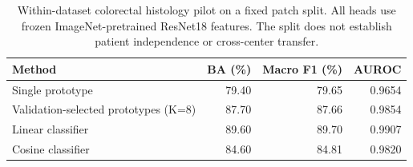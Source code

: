 \begin{table}[t]
\centering
\small
\caption{Within-dataset colorectal histology pilot on a fixed patch split. All heads use frozen ImageNet-pretrained ResNet18 features. The split does not establish patient independence or cross-center transfer.}
\label{tab:histology-pilot}
\begin{tabular}{lrrr}
\hline
Method & BA (\%) & Macro F1 (\%) & AUROC \\
\hline
Single prototype & 79.40 & 79.65 & 0.9654 \\
Validation-selected prototypes (K=8) & 87.70 & 87.66 & 0.9854 \\
Linear classifier & 89.60 & 89.70 & 0.9907 \\
Cosine classifier & 84.60 & 84.81 & 0.9820 \\
\hline
\end{tabular}
\end{table}
